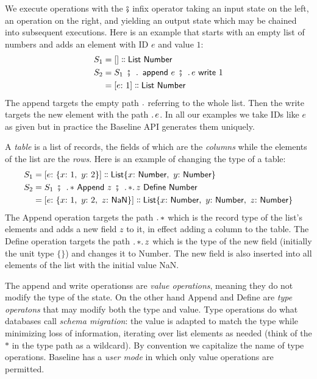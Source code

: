 \documentclass[english,submission]{programming}
\theoremstyle{definition}
\newcommand{\mathbox}[1]{\colorbox{black!10}{$#1$}}
\DeclareMathOperator{\exec}{\ \fatsemi\ \ }
\newcommand{\is}{{:}\ }
\newcommand{\comma}{,\ }
\newcommand{\isa}{\dblcolon}
\begin{document}
We execute operations with the \mathbox{\fatsemi} infix operator taking an input state on the left, an operation on the right, and yielding an output state which may be chained into subsequent executions. Here is an example that starts with an empty list of numbers and adds an element with ID $e$ and value $1$:
\begin{align*}
S_1 &= [] \isa \textsf{List Number}\\
S_2 &= S_1 \exec \ldotp \textsf{ append } e \exec \ldotp e \textsf{ write } 1\\
&= [e \is 1] \isa \textsf{List Number}\\
\end{align*}
The \textsf{append} targets the empty path \mathbox{\ldotp} referring to the whole list. Then the \textsf{write} targets the new element with the path \mathbox{\ldotp e}. In all our examples we take IDs like $e$ as given but in practice the Baseline API generates them uniquely.

A \textit{table} is a list of records, the fields of which are the \textit{columns} while the elements of the list are the \textit{rows}. Here is an example of changing the type of a table:
\begin{align*}
S_1 &= [e \is \{x \is 1 \comma  y \is 2\}] \isa \textsf{List} \{x \is \textsf{Number}\comma  y \is \textsf{Number}\}\\
S_2 &= S_1 \exec \ldotp * \textsf{ Append } z \exec \ldotp * \ldotp z \textsf{ Define Number}\\
 &= [e \is \{x \is 1\comma  y \is 2,\ z\is \textsf{NaN}\}] \isa \textsf{List} \{x \is \textsf{Number}\comma  y \is \textsf{Number}\comma z\is \textsf{Number}\}\\
\end{align*}
The \textsf{Append} operation targets the path \mathbox{\ldotp *} which is the record type of the list's elements and adds a new field \mathbox{z} to it, in effect adding a column to the table. The \textsf{Define} operation targets the path \mathbox{\ldotp  * \ldotp z} which is the type of the new field (initially the unit type $\{\}$) and changes it to \textsf{Number}. The new field is also inserted into all elements of the list with the initial value \textsf{NaN}.

The \textsf{append} and \textsf{write} operationss are \textit{value operations}, meaning they do not modify the type of the state. On the other hand \textsf{Append} and \textsf{Define} are \textit{type operatons} that may modify both the type and value. Type operations do what databases call \textit{schema migration}: the value is adapted to match the type while minimizing loss of information, iterating over list elements as needed (think of the $*$ in the type path as a wildcard). By convention we capitalize the name of type operations. Baseline has a \textit{user mode} in which only value operations are permitted.
\end{document}

